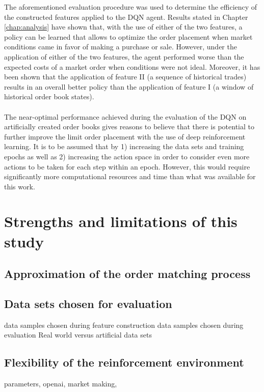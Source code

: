     The aforementioned evaluation procedure was used to determine the efficiency of the constructed features applied to the DQN agent.
    Results stated in Chapter \ref{chap:analysis} have shown that, with the use of either of the two features, a policy can be learned that allows to optimize the order placement when market conditions came in favor of making a purchase or sale.
    However, under the application of either of the two features, the agent performed worse than the expected costs of a market order when conditions were not ideal.
    Moreover, it has been shown that the application of feature II (a sequence of historical trades) results in an overall better policy than the application of feature I (a window of historical order book states).
    \\
    \\
The near-optimal performance achieved during the evaluation of the DQN on artificially created order books gives reasons to believe that there is potential to further improve the limit order placement with the use of deep reinforcement learning.
It is to be assumed that by 1) increasing the data sets and training epochs as well as 2) increasing the action space in order to consider even more actions to be taken for each step within an epoch.
However, this would require significantly more computational resources and time than what was available for this work.


\section{Strengths and limitations of this study}

\subsection{Approximation of the order matching process}

\subsection{Data sets chosen for evaluation}
data samples chosen during feature construction
data samples chosen during evaluation
Real world versus artificial data sets

\subsection{Flexibility of the reinforcement environment}
parameters, openai, market making,

